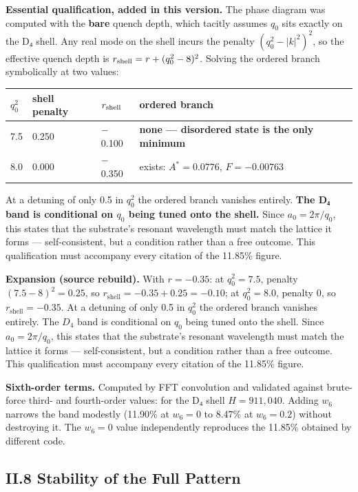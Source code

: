 \documentclass[a4paper,11pt]{article}
\newcommand{\expansion}[1]{\par\smallskip\noindent\textbf{Expansion (source rebuild).} #1\par\smallskip}
\begin{document}
\textbf{Essential qualification, added in this version.} The phase diagram was computed with the \textbf{bare} quench depth, which tacitly assumes $q_0$ sits exactly on the D₄ shell. Any real mode on the shell incurs the penalty $(q_0^2-|k|^2)^2$, so the effective quench depth is $r_{\rm shell}=r+(q_0^2-8)^2$. Solving the ordered branch symbolically at two values:

\begin{center}
\begin{xltabular}{\linewidth}{lllX}
\hline
$q_0^2$ & shell penalty & $r_{\rm shell}$ & ordered branch \\
 & 0.250 & $-$0.100 & \textbf{none — disordered state is the only minimum} \\
8.0 & 0.000 & $-$0.350 & exists: $A^{*}=0.0776$, $F=-0.00763$ \\
\hline
\end{xltabular}
\end{center}

At a detuning of only 0.5 in $q_0^2$ the ordered branch vanishes entirely. \textbf{The D₄ band is conditional on $q_0$ being tuned onto the shell.} Since $a_0=2\pi/q_0$, this states that the substrate's resonant wavelength must match the lattice it forms — self-consistent, but a condition rather than a free outcome. This qualification must accompany every citation of the 11.85\% figure.


\expansion{With $r = -0.35$: at $q_0^2 = 7.5$, penalty $(7.5-8)^2 = 0.25$, so $r_{\mathrm{shell}} = -0.35 + 0.25 = -0.10$; at $q_0^2 = 8.0$, penalty $0$, so $r_{\mathrm{shell}} = -0.35$. At a detuning of only 0.5 in $q_0^2$ the ordered branch vanishes entirely. The $D_4$ band is conditional on $q_0$ being tuned onto the shell. Since $a_0 = 2\pi/q_0$, this states that the substrate's resonant wavelength must match the lattice it forms --- self-consistent, but a condition rather than a free outcome. This qualification must accompany every citation of the 11.85\% figure.}
\textbf{Sixth-order terms.} Computed by FFT convolution and validated against brute-force third- and fourth-order values: for the D₄ shell $H=911{,}040$. Adding $w_6$ narrows the band modestly (11.90\% at $w_6=0$ to 8.47\% at $w_6=0.2$) without destroying it. The $w_6=0$ value independently reproduces the 11.85\% obtained by different code.

\subsection*{II.8 Stability of the Full Pattern}
\end{document}
